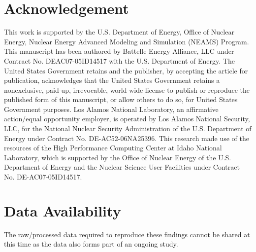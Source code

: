 \documentclass[review]{elsarticle}
\begin{document}
\section{Acknowledgement}
This work is supported by the U.S. Department of Energy, Office of Nuclear Energy, Nuclear Energy Advanced Modeling and Simulation (NEAMS) Program. This manuscript has been authored by Battelle Energy Alliance, LLC under Contract No. DEAC07-05ID14517 with the U.S. Department of Energy. The United States Government retains and the publisher, by accepting the article for publication, acknowledges that the United States Government retains a nonexclusive, paid-up, irrevocable, world-wide license to publish or reproduce the published form of this manuscript, or allow others to do so, for United States Government purposes.  Los Alamos National Laboratory, an affirmative action/equal opportunity employer, is operated by Los Alamos National Security, LLC, for the National Nuclear Security Administration of the U.S. Department of Energy under Contract No. DE-AC52-06NA25396.  This research made use of the resources of the High Performance Computing Center at Idaho National Laboratory, which is supported by the Office of Nuclear Energy of the U.S. Department of Energy and the Nuclear Science User Facilities under Contract No. DE-AC07-05ID14517. 


\section{Data Availability}

The raw/processed data required to reproduce these findings cannot be shared at this time as the data also forms part of an ongoing study.
\end{document}
